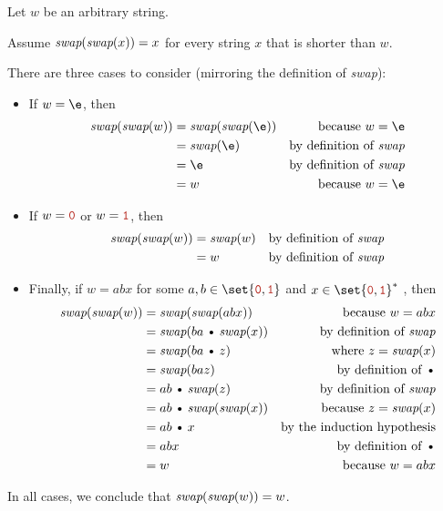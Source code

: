 \documentclass[11pt]{article}
\def\Cdot{\mathbin{\text{\normalfont \textbullet}}}
\def\Sym#1{\texttt{\color{BrickRed}#1}}
\begin{document}
\begin{enumerate}
\begin{enumerate}
\begin{Solution}
\parindent0pt
Let $w$ be an arbitrary string.

Assume $\emph{swap}(\emph{swap}(x)) = x$ for every string $x$ that is shorter than $w$.

There are three cases to consider (mirroring the definition of \emph{swap}):
\begin{itemize}
\item
If $w = \e$, then 
\begin{align*}
	\emph{swap}(\emph{swap}(w))
	&= \emph{swap}(\emph{swap}(\e))		& \text{because $w=\e$} \\
	&= \emph{swap}(\e)					& \text{by definition of \emph{swap}} \\
	&= \e								& \text{by definition of \emph{swap}} \\
	&= w								& \text{because $w=\e$}
\end{align*}
\item
If $w = \Sym0$ or $w = \Sym 1$, then 
\begin{align*}
	\emph{swap}(\emph{swap}(w))
	&= \emph{swap}(w)					& \text{by definition of \emph{swap}} \\
	&= w								& \text{by definition of \emph{swap}}
\end{align*}
\item
Finally, if $w = abx$ for some $a,b\in\set{\Sym0,\Sym1}$ and $x\in\set{\Sym0,\Sym1}^*$ , then
\begin{align*}
	\emph{swap}(\emph{swap}(w))
	&= \emph{swap}(\emph{swap}(abx))	& \text{because $w = abx$} \\
	&= \emph{swap}(ba\Cdot\emph{swap}(x))
										& \text{by definition of \emph{swap}} \\
	&= \emph{swap}(ba\Cdot z)
										& \text{where $z = \emph{swap}(x)$} \\
	&= \emph{swap}(baz)
										& \text{by definition of $\Cdot$} \\
	&= ab\Cdot \emph{swap}(z)
										& \text{by definition of \emph{swap}} \\
	&= ab\Cdot \emph{swap}(\emph{swap}(x))
										& \text{because $z = \emph{swap}(x)$} \\
	&= ab\Cdot x							& \text{by the induction hypothesis}\\
	&= abx 								& \text{by definition of $\Cdot$} \\
	&= w	 							& \text{because $w = abx$}
\end{align*}
\end{itemize}
In all cases, we conclude that $\emph{swap}(\emph{swap}(w)) = w$.
\end{Solution}
\unskip


\end{enumerate}
\end{enumerate}
\end{document}

